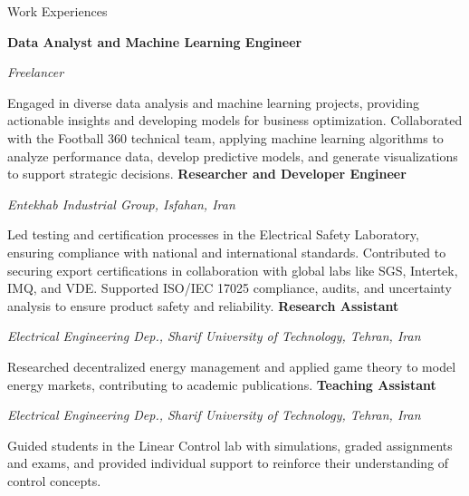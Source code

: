 \begin{rubric}{Work Experiences}

%
	\textbf{Data Analyst and Machine Learning Engineer} 
    \par \emph{Freelancer}
    \par Engaged in diverse data analysis and machine learning projects, providing actionable insights and developing models for business optimization. Collaborated with the Football 360 technical team, applying machine learning algorithms to analyze performance data, develop predictive models, and generate visualizations to support strategic decisions.
%
%
	\textbf{Researcher and Developer Engineer } 
    \par \emph{Entekhab Industrial Group, Isfahan, Iran}
    \par Led testing and certification processes in the Electrical Safety Laboratory, ensuring compliance with national and international standards. Contributed to securing export certifications in collaboration with global labs like SGS, Intertek, IMQ, and VDE. Supported ISO/IEC 17025 compliance, audits, and uncertainty analysis to ensure product safety and reliability.
%
%
	\textbf{Research Assistant} 
    \par \emph{Electrical Engineering Dep., Sharif University of Technology, Tehran, Iran}
    \par Researched decentralized energy management and applied game theory to model energy markets, contributing to academic publications.
%
%
	\textbf{Teaching Assistant}
    \par \emph{Electrical Engineering Dep., Sharif University of Technology, Tehran, Iran}
    \par Guided students in the Linear Control lab with simulations, graded assignments and exams, and provided individual support to reinforce their understanding of control concepts.
\end{rubric}